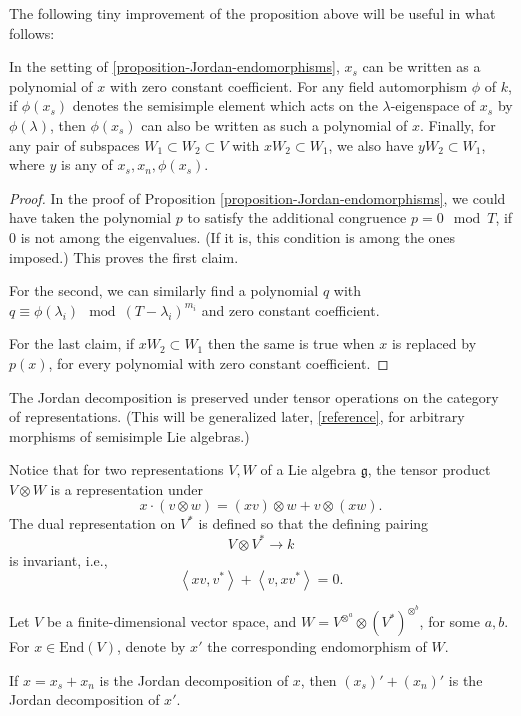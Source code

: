 The following tiny improvement of the proposition above will be useful in what follows:

\begin{lemma}
\label{lemma-Jordan-extension}
In the setting of \ref{proposition-Jordan-endomorphisms}, $x_s$ can be written as a polynomial of $x$ with zero constant coefficient. For any field automorphism $\phi$ of $k$, if $\phi(x_s)$ denotes the semisimple element which acts on the $\lambda$-eigenspace of $x_s$ by $\phi(\lambda)$, then $\phi(x_s)$ can also be written as such a polynomial of $x$. Finally, for any pair of subspaces $W_1\subset W_2\subset V$ with $xW_2\subset W_1$, we also have $yW_2\subset W_1$, where $y$ is any of $x_s, x_n, \phi(x_s)$.
\end{lemma}

\begin{proof}
 In the proof of Proposition \ref{proposition-Jordan-endomorphisms}, we could have taken the polynomial $p$ to satisfy the additional congruence $p = 0 \mod T$, if $0$ is not among the eigenvalues. (If it is, this condition is among the ones imposed.) This proves the first claim.
 
 For the second, we can similarly find a polynomial $q$ with $q\equiv \phi(\lambda_i) \mod (T-\lambda_i)^{m_i}$ and zero constant coefficient. 
 
 For the last claim, if $xW_2\subset W_1$ then the same is true when $x$ is replaced by $p(x)$, for every polynomial with zero constant coefficient.
\end{proof}


The Jordan decomposition is preserved under tensor operations on the category of representations. (This will be generalized later, \ref{reference}, for arbitrary morphisms of semisimple Lie algebras.)

Notice that for two representations $V, W$ of a Lie algebra $\mathfrak g$, the tensor product $V\otimes W$ is a representation under 
$$ x \cdot (v\otimes w) = (xv)\otimes w + v\otimes (xw).$$
The dual representation on $V^*$ is defined so that the defining pairing
$$ V\otimes V^*\to k$$ 
is invariant, i.e., 
\begin{equation}
 \label{equation-dual-representation-Liealgebra}
\left< xv, v^*\right> + \left < v, xv^*\right> =0.
\end{equation}

\begin{lemma}
\label{lemma-Jordan-tensors}
Let $V$ be a finite-dimensional vector space, and $W = V^{\otimes^a}\otimes (V^*)^{\otimes^b}$, for some $a, b$. For $x\in \text{End}(V)$, denote by $x'$ the corresponding endomorphism of $W$.

If $x=x_s + x_n$ is the Jordan decomposition of $x$, then $(x_s)'+(x_n)'$ is the Jordan decomposition of $x'$. 
\end{lemma}


